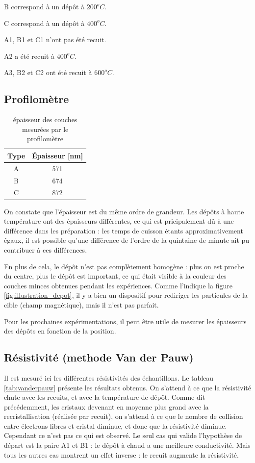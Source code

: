 \documentclass[a4paper,12pt,oneside]{article}
\begin{document}
B correspond à un dépôt à $200^oC$.

C correspond à un dépôt à $400^oC$.

A1, B1 et C1 n'ont pas été recuit.

A2 a été recuit à $400^oC$.

A3, B2 et C2 ont été recuit à $600^oC$.

\subsection{Profilomètre}

\begin{table}[ht]
\centering
   \begin{tabular}{|c|c|}
	  \hline
	  Type & Épaisseur [nm]\\
	  \hline
	  A & 571 \\
	  B & 674 \\
	  C & 872 \\
	  \hline
   \end{tabular}
   \caption{épaisseur des couches mesurées par le profilomètre}\label{tab:profil}
\end{table}
On constate que l'épaisseur est du même ordre de grandeur. Les dépôts à haute température ont des épaisseurs différentes, ce qui est pricipalement dû à une différence dans les préparation : les temps de cuisson étants approximativement égaux, il est possible qu'une différence de l'ordre de la quintaine de minute ait pu contribuer à ces différences.

En plus de cela, le dépôt n'est pas complètement homogène : plus on est proche du centre, plus le dépôt est important, ce qui était visible à la couleur des couches minces obtenues pendant les expériences. Comme l'indique la figure \ref{fig:illustration_depot}, il y a bien un dispositif pour rediriger les particules de la cible (champ magnétique), mais il n'est pas parfait.

Pour les prochaines expérimentations, il peut être utile de mesurer les épaisseurs des dépôts en fonction de la position.

\subsection{Résistivité (methode Van der Pauw)}

Il est mesuré ici les différentes résistivités des échantillons. Le tableau \ref{tab:vanderpauw} présente les résultats obtenus. On s'attend à ce que la résistivité chute avec les recuits, et avec la température de dépôt. Comme dit précédemment, les cristaux devenant en moyenne plus grand avec la recristallisation (réalisée par recuit), on s'attend à ce que le nombre de collision entre électrons libres et cristal diminue, et donc que la résistivité diminue. Cependant ce n'est pas ce qui est observé. Le seul cas qui valide l'hypothèse de départ est la paire A1 et B1 : le dépôt à chaud a une meilleure conductivité. Mais tous les autres cas montrent un effet inverse : le recuit augmente la résistivité.
\end{document}
